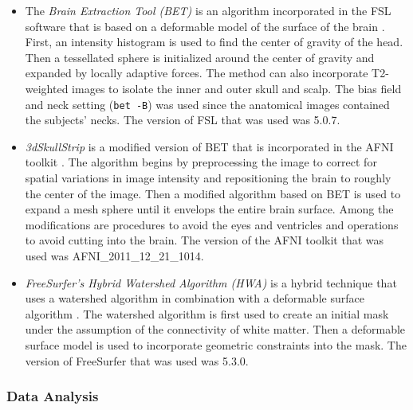 \begin{itemize}
    \item The \emph{Brain Extraction Tool (BET)} is an algorithm incorporated in the FSL software that is based on a deformable model of the surface of the brain \cite{Smith2002}. First, an intensity histogram is used to find the center of gravity of the head. Then a tessellated sphere is initialized around the center of gravity and expanded by locally adaptive forces. The method can also incorporate T2-weighted images to isolate the inner and outer skull and scalp. The bias field and neck setting ({\tt bet -B}) was used since the anatomical images contained the subjects' necks. The version of FSL that was used was 5.0.7.

    \item \emph{3dSkullStrip} is a modified version of BET that is incorporated in the AFNI toolkit \cite{afni}. The algorithm begins by preprocessing the image to correct for spatial variations in image intensity and repositioning the brain to roughly the center of the image. Then a modified algorithm based on BET is used to expand a mesh sphere until it envelops the entire brain surface. Among the modifications are procedures to avoid the eyes and ventricles and operations to avoid cutting into the brain. The version of the AFNI toolkit that was used was AFNI\_2011\_12\_21\_1014.

    \item \emph{FreeSurfer's Hybrid Watershed Algorithm (HWA)} is a hybrid technique that uses a watershed algorithm in combination with a deformable surface algorithm \cite{Segonne2004}. The watershed algorithm is first used to create an initial mask under the assumption of the connectivity of white matter. Then a deformable surface model is used to incorporate geometric constraints into the mask. The version of FreeSurfer that was used was 5.3.0.
\end{itemize}



\subsubsection*{Data Analysis}

